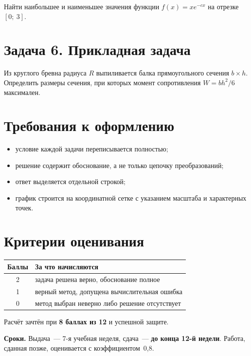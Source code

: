 \documentclass[12pt, a4paper]{article}
\begin{document}
Найти наибольшее и наименьшее значения функции $f(x) = x e^{-cx}$
на отрезке $[0;\ 3]$.

\section*{Задача 6. Прикладная задача}

Из круглого бревна радиуса $R$ выпиливается балка прямоугольного сечения
$b \times h$. Определить размеры сечения, при которых момент сопротивления
$W = bh^2/6$ максимален.

\vspace{1.2em}

\section*{Требования к оформлению}

\begin{itemize}[nosep]
  \item условие каждой задачи переписывается полностью;
  \item решение содержит обоснование, а не только цепочку преобразований;
  \item ответ выделяется отдельной строкой;
  \item график строится на координатной сетке с указанием масштаба
        и характерных точек.
\end{itemize}

\section*{Критерии оценивания}

\begin{center}
\begin{tabular}{|c|l|}
  \hline
  Баллы & За что начисляются \\
  \hline
  2 & задача решена верно, обоснование полное \\
  1 & верный метод, допущена вычислительная ошибка \\
  0 & метод выбран неверно либо решение отсутствует \\
  \hline
\end{tabular}
\end{center}

\vspace{0.5em}
\noindent
Расчёт зачтён при \textbf{8 баллах из 12} и успешной защите.

\vspace{0.7em}
\noindent\textbf{Сроки.} Выдача~--- 7-я учебная неделя,
сдача~--- \textbf{до конца 12-й недели}. Работа, сданная позже, оценивается
с коэффициентом~0{,}8.
\end{document}
